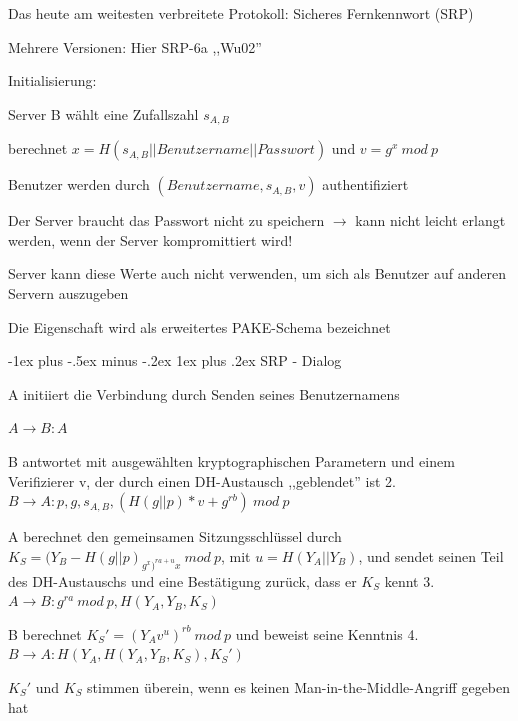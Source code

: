 \documentclass[a4paper]{article}
\makeatletter
\renewcommand{\subsubsection}{\@startsection{subsubsection}{3}{0mm}%
 {-1ex plus -.5ex minus -.2ex}%
 {1ex plus .2ex}%
 {\normalfont\small\bfseries}}
\makeatother
\begin{document}
\begin{multicols}{3}
      \begin{itemize*}
            \item Das heute am weitesten verbreitete Protokoll: Sicheres Fernkennwort
            (SRP)
            \item Mehrere Versionen: Hier SRP-6a ,,Wu02''
            \item Initialisierung:
            \begin{itemize*}
                  \item Server B wählt eine Zufallszahl $s_{A,B}$
                  \item berechnet $x=H(s_{A,B} || Benutzername || Passwort)$ und $v=g^x\ mod\ p$
                  \item Benutzer werden durch $(Benutzername, s_{A,B}, v)$ authentifiziert
                  \item Der Server braucht das Passwort nicht zu speichern $\rightarrow$ kann nicht leicht erlangt werden, wenn der Server kompromittiert wird!
                  \item Server kann diese Werte auch nicht verwenden, um sich als Benutzer auf anderen Servern auszugeben
                  \item Die Eigenschaft wird als erweitertes PAKE-Schema bezeichnet
            \end{itemize*}
      \end{itemize*}


      \subsubsection{SRP - Dialog}

      \begin{itemize*}
            \item A initiiert die Verbindung durch Senden seines Benutzernamens
            \begin{enumerate*}
                  \def\labelenumi{\arabic{enumi}.}
                  \item $A\rightarrow B: A$
            \end{enumerate*}
            \item B antwortet mit ausgewählten kryptographischen Parametern und einem
            Verifizierer v, der durch einen DH-Austausch ,,geblendet'' ist 2.
            $B\rightarrow A: p, g, s_{A,B}, (H(g
                  || p)*v + g^{rb})\ mod\ p$
            \item A berechnet den gemeinsamen Sitzungsschlüssel durch $K_S=(Y_B-H(g
                  || p)_{g^x)^{ra+u}x}\ mod\ p$, mit $u=H(Y_A|| Y_B)$, und
            sendet seinen Teil des DH-Austauschs und eine Bestätigung zurück, dass
            er $K_S$ kennt 3. $A\rightarrow
                  B:g^{ra}\ mod\ p,
                  H(Y_A,Y_B,K_S)$
            \item B berechnet $K_S'=(Y_A v^u)^{rb}\ mod\ p$ und beweist seine Kenntnis 4.
            $B\rightarrow A:H(Y_A, H(Y_A,Y_B,K_S),K_S')$
            \item $K_S'$ und $K_S$ stimmen überein, wenn es keinen
            Man-in-the-Middle-Angriff gegeben hat
      \end{itemize*}



\end{multicols}
\end{document}

